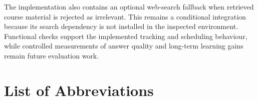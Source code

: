 \documentclass[11pt, a4paper, oneside]{report}
\begin{document}
The implementation also contains an optional web-search fallback when retrieved course material is rejected as irrelevant. This remains a conditional integration because its search dependency is not installed in the inspected environment. Functional checks support the implemented tracking and scheduling behaviour, while controlled measurements of answer quality and long-term learning gains remain future evaluation work.


\newpage
\tableofcontents

\newpage
\listoffigures

\newpage
\listoftables

\newpage
\chapter*{List of Abbreviations}
\end{document}
